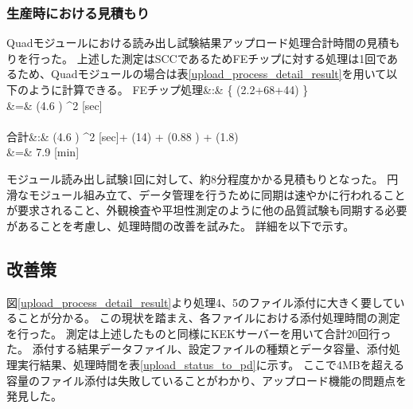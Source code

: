 \subsubsection{生産時における見積もり}
Quadモジュールにおける読み出し試験結果アップロード処理合計時間の見積もりを行った。
上述した測定はSCCであるためFEチップに対する処理は1回であるため、Quadモジュールの場合は表\ref{upload_process_detail_result}を用いて以下のように計算できる。
\bbb
{\rm FE}チップ処理&:& \left\{ (2.2+68+44) \pm {}  \right\} \nonumber \\
&=& (4.6  ) ^2 [{\rm sec}]\\\\
合計&:& (4.6  ) ^2 [\rm{sec}]+ (14) + (0.88 ) + (1.8) \nonumber \\
&=& 7.9  [{\rm min}]
\eee

モジュール読み出し試験1回に対して、約8分程度かかる見積もりとなった。
円滑なモジュール組み立て、データ管理を行うために同期は速やかに行われることが要求されること、外観検査や平坦性測定のように他の品質試験も同期する必要があることを考慮し、処理時間の改善を試みた。
詳細を以下で示す。


\subsection{改善策}

図\ref{upload_process_detail_result}より処理4、5のファイル添付に大きく要していることが分かる。
この現状を踏まえ、各ファイルにおける添付処理時間の測定を行った。
測定は上述したものと同様にKEKサーバーを用いて合計20回行った。
添付する結果データファイル、設定ファイルの種類とデータ容量、添付処理実行結果、処理時間を表\ref{upload_status_to_pd}に示す。
ここで4MBを超える容量のファイル添付は失敗していることがわかり、アップロード機能の問題点を発見した。

